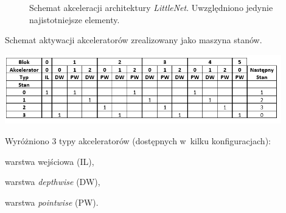 \begin{figure}
    \caption{Schemat akceleracji architektury \emph{LittleNet}. Uwzględniono jedynie najistotniejsze elementy.}
    \label{fig:LNACC}
\end{figure}
\begin{table}
    \centering
    \caption{Schemat aktywacji akceleratorów zrealizowany jako maszyna stanów.}
    \label{tab:LNACC}
    \includegraphics[width=0.9\textwidth]{images/acc_activ.png}
\end{table}

Wyróżniono 3 typy akceleratorów (dostępnych w~kilku konfiguracjach):
\begin{description}
\item warstwa wejściowa (IL),
\item warstwa \emph{depthwise} (DW),
\item warstwa \emph{pointwise} (PW).
\end{description}

